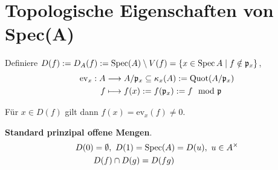 \section{Topologische Eigenschaften von Spec(A)}
\label{sec:topologische-eigenschaften-von-spec-A}

Definiere $D(f):=D_{A}(f):=\operatorname{Spec}(A)\setminus V(f)=\{x \in\operatorname{Spec} A \mid f\notin\mathfrak{p}_{x}\}$,
\begin{align*}
  \text{ev}_{x}:A & \longrightarrow A/\mathfrak{p}_{x}\subseteq \kappa_{x}(A) := \operatorname{Quot}(A/\mathfrak{p}_{x})\\
  f & \longmapsto f(x) := f(\mathfrak{p}_{x}) := f \mod \mathfrak{p}
\end{align*}

Für $x \in D(f)$ gilt dann $f(x) = \text{ev}_{x}(f) \neq 0$.

\textbf{Standard prinzipal offene Mengen}.
\begin{align*}
  D(0) & =\emptyset,\ D(1)=\operatorname{Spec}(A)=D(u),\ u\in A^{\times}\\    
  & D(f)\cap D(g) = D(fg)
\end{align*}

